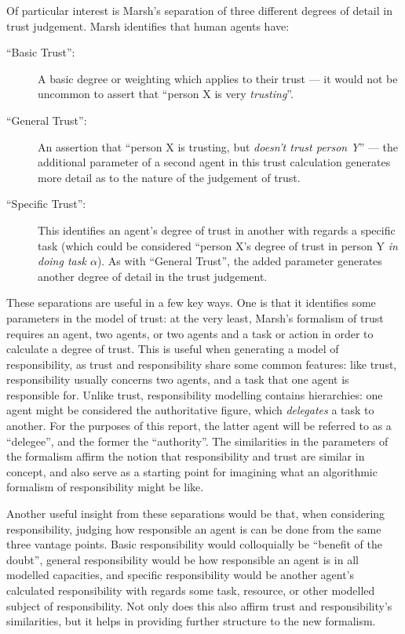 Of particular interest is Marsh's separation of three different degrees of detail in trust judgement. Marsh identifies that human agents have:

\begin{description}
    \item [``Basic Trust'': ] A basic degree or weighting which applies to their trust --- it would not be uncommon to assert that ``person X is very \emph{trusting}''.
    \item [``General Trust'': ] An assertion that ``person X is trusting, but \emph{doesn't trust person Y}'' --- the additional parameter of a second agent in this trust calculation generates more detail as to the nature of the judgement of trust.
    \item [``Specific Trust'': ] This identifies an agent's degree of trust in another with regards a specific task (which could be considered ``person X's degree of trust in person Y \emph{in doing task \(\alpha\)}). As with ``General Trust'', the added parameter generates another degree of detail in the trust judgement.
\end{description}

These separations are useful in a few key ways. One is that it identifies some parameters in the model of trust: at the very least, Marsh's formalism of trust requires an agent, two agents, or two agents and a task or action in order to calculate a degree of trust. This is useful when generating a model of responsibility, as trust and responsibility share some common features: like trust, responsibility usually concerns two agents, and a task that one agent is responsible for. Unlike trust, responsibility modelling contains hierarchies: one agent might be considered the authoritative figure, which \emph{delegates} a task to another. For the purposes of this report, the latter agent will be referred to as a ``delegee'', and the former the ``authority''. The similarities in the parameters of the formalism affirm the notion that responsibility and trust are similar in concept, and also serve as a starting point for imagining what an algorithmic formalism of responsibility might be like.\par

Another useful insight from these separations would be that, when considering responsibility, judging how responsible an agent is can be done from the same three vantage points. Basic responsibility would colloquially be ``benefit of the doubt'', general responsibility would be how responsible an agent is in all modelled capacities, and specific responsibility would be another agent's calculated responsibility with regards some task, resource, or other modelled subject of responsibility. Not only does this also affirm trust and responsibility's similarities, but it helps in providing further structure to the new formalism.\par

